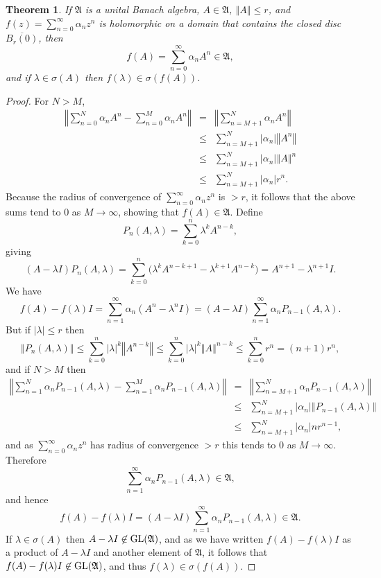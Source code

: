 \documentclass{article}
\newcommand{\GL}{\ensuremath\mathrm{GL}}
\newcommand{\norm}[1]{\left\Vert #1 \right\Vert}
\newtheorem{theorem}{Theorem}
\theoremstyle{definition}
\begin{document}
\begin{theorem}
If $\mathfrak{A}$ is a unital Banach algebra, $A \in \mathfrak{A}$, $\norm{A} \leq r$, and $f(z)=\sum_{n=0}^\infty \alpha_n z^n$ is holomorphic on a domain that contains the closed disc $\overline{B_r(0)}$,
then
\[
f(A)=\sum_{n=0}^\infty \alpha_n A^n \in \mathfrak{A},
\]
and if $\lambda \in \sigma(A)$ then $f(\lambda) \in \sigma(f(A))$.
\label{mapping}
\end{theorem}
\begin{proof}
For $N>M$,
\begin{eqnarray*}
\norm{\sum_{n=0}^N \alpha_n A^n -\sum_{n=0}^M \alpha_n A^n} &=&\norm{ \sum_{n=M+1}^N \alpha_n A^n}\\
&\leq& \sum_{n=M+1}^N |\alpha_n| \norm{A^n}\\
&\leq&\sum_{n=M+1}^N |\alpha_n| \norm{A}^n\\
&\leq&\sum_{n=M+1}^N |\alpha_n| r^n.
\end{eqnarray*}
Because the radius of convergence of $\sum_{n=0}^\infty \alpha_n z^n$ is $>r$, it follows that the above sums tend to $0$ as $M \to \infty$, showing that
$f(A) \in \mathfrak{A}$.
Define
\[
P_n(A,\lambda)=\sum_{k=0}^n \lambda^k A^{n-k},
\]
giving
\[
(A-\lambda I)P_n(A,\lambda)=\sum_{k=0}^n\Big( \lambda^k A^{n-k+1} -  \lambda^{k+1} A^{n-k}\Big)
=A^{n+1} - \lambda^{n+1} I.
\]
We have
\[
f(A)-f(\lambda)I = \sum_{n=1}^\infty \alpha_n(A^n - \lambda^n I) =
(A-\lambda I) \sum_{n=1}^\infty \alpha_n P_{n-1}(A,\lambda).
\]
But  if $|\lambda| \leq r$ then
\[
\norm{P_n(A,\lambda)} \leq \sum_{k=0}^n |\lambda|^k \norm{A^{n-k}}
\leq \sum_{k=0}^n |\lambda|^k \norm{A}^{n-k} \leq \sum_{k=0}^n r^n=(n+1)r^n,
\]
and if $N>M$ then
\begin{eqnarray*}
\norm{\sum_{n=1}^N \alpha_n P_{n-1}(A,\lambda) - \sum_{n=1}^M \alpha_n P_{n-1}(A,\lambda)}&=&
\norm{\sum_{n=M+1}^N \alpha_n P_{n-1}(A,\lambda)}\\
&\leq&\sum_{n=M+1}^N |\alpha_n| \norm{P_{n-1}(A,\lambda)}\\
&\leq&\sum_{n=M+1}^N |\alpha_n| n r^{n-1},
\end{eqnarray*}
and as $\sum_{n=0}^\infty \alpha_n z^n$ has radius of convergence $>r$ this tends to $0$ as $M \to \infty$.
Therefore
\[
\sum_{n=1}^\infty \alpha_n P_{n-1}(A,\lambda) \in \mathfrak{A},
\]
and hence
\[
f(A)-f(\lambda)I = (A-\lambda I) \sum_{n=1}^\infty \alpha_n P_{n-1}(A,\lambda) \in \mathfrak{A}.
\]
If $\lambda \in \sigma(A)$ then $A-\lambda I \not \in \GL(\mathfrak{A})$, and as we have written $f(A)-f(\lambda)I$ as a product of $A-\lambda I$ and another element of $\mathfrak{A}$,
it follows that $f(A)-f(\lambda)I \not \in \GL(\mathfrak{A})$, and thus $f(\lambda) \in \sigma(f(A))$.
\end{proof}
\end{document}
